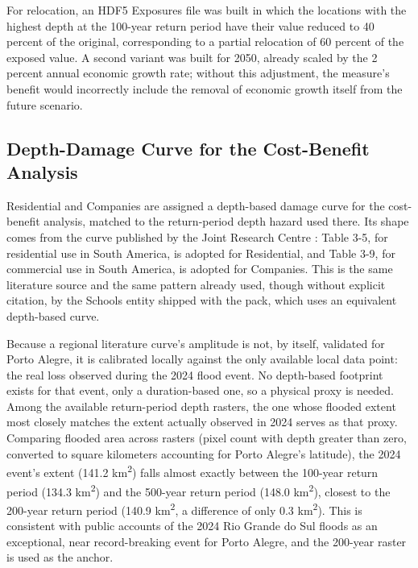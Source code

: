 \documentclass[11pt]{article}
\begin{document}
For relocation, an HDF5 Exposures file was built in which the locations with the highest
depth at the 100-year return period have their value reduced to 40 percent of the original,
corresponding to a partial relocation of 60 percent of the exposed value. A second variant
was built for 2050, already scaled by the 2 percent annual economic growth rate; without
this adjustment, the measure's benefit would incorrectly include the removal of economic
growth itself from the future scenario.

\subsection{Depth-Damage Curve for the Cost-Benefit Analysis}
\label{sec:depth-curve}

Residential and Companies are assigned a depth-based damage curve for the cost-benefit
analysis, matched to the return-period depth hazard used there. Its shape comes from the
curve published by the Joint Research Centre \citep{huizinga2017}: Table 3-5, for
residential use in South America, is adopted for Residential, and Table 3-9, for commercial
use in South America, is adopted for Companies. This is the same literature source and the
same pattern already used, though without explicit citation, by the Schools entity shipped
with the pack, which uses an equivalent depth-based curve.

Because a regional literature curve's amplitude is not, by itself, validated for Porto
Alegre, it is calibrated locally against the only available local data point: the real loss
observed during the 2024 flood event. No depth-based footprint exists for that event, only
a duration-based one, so a physical proxy is needed. Among the available return-period
depth rasters, the one whose flooded extent most closely matches the extent actually
observed in 2024 serves as that proxy. Comparing flooded area across rasters (pixel count
with depth greater than zero, converted to square kilometers accounting for Porto Alegre's
latitude), the 2024 event's extent (141.2 km\textsuperscript{2}) falls almost exactly
between the 100-year return period (134.3 km\textsuperscript{2}) and the 500-year return
period (148.0 km\textsuperscript{2}), closest to the 200-year return period (140.9
km\textsuperscript{2}, a difference of only 0.3 km\textsuperscript{2}). This is consistent
with public accounts of the 2024 Rio Grande do Sul floods as an exceptional, near
record-breaking event for Porto Alegre, and the 200-year raster is used as the anchor.
\end{document}
